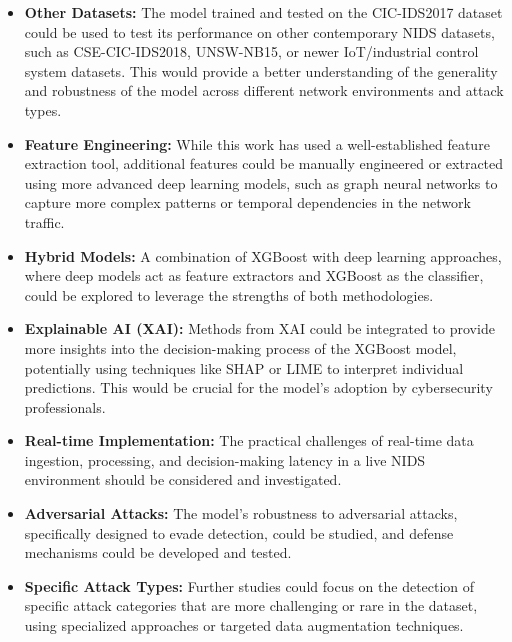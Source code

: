 \begin{itemize} 
\item \textbf{Other Datasets: } The model trained and tested on the CIC-IDS2017 dataset could be used to test its performance on other contemporary NIDS datasets, such as CSE-CIC-IDS2018, UNSW-NB15, or newer IoT/industrial control system datasets. This would provide a better understanding of the generality and robustness of the model across different network environments and attack types.
\item \textbf{Feature Engineering: } While this work has used a well-established feature extraction tool, additional features could be manually engineered or extracted using more advanced deep learning models, such as graph neural networks to capture more complex patterns or temporal dependencies in the network traffic.
\item \textbf{Hybrid Models: } A combination of XGBoost with deep learning approaches, where deep models act as feature extractors and XGBoost as the classifier, could be explored to leverage the strengths of both methodologies.
\item \textbf{Explainable AI (XAI): } Methods from XAI could be integrated to provide more insights into the decision-making process of the XGBoost model, potentially using techniques like SHAP or LIME to interpret individual predictions. This would be crucial for the model's adoption by cybersecurity professionals.
\item \textbf{Real-time Implementation: } The practical challenges of real-time data ingestion, processing, and decision-making latency in a live NIDS environment should be considered and investigated.
\item \textbf{Adversarial Attacks: } The model's robustness to adversarial attacks, specifically designed to evade detection, could be studied, and defense mechanisms could be developed and tested.
\item \textbf{Specific Attack Types: } Further studies could focus on the detection of specific attack categories that are more challenging or rare in the dataset, using specialized approaches or targeted data augmentation techniques.
\end{itemize} 